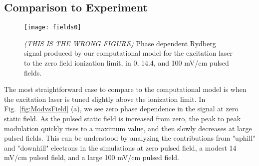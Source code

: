 \documentclass[aps,pra,preprint,groupedaddress]{revtex4-1}
\begin{document}

\subsection{Comparison to Experiment}
\label{sec:ComptoExp}









\begin{figure}
	\texttt{[image: fields0]}
	\caption{\emph{(THIS IS THE WRONG FIGURE)} Phase dependent Rydberg signal produced by our computational model for the excitation laser to the zero field ionization limit, in 0, 14.4, and 100 mV/cm pulsed fields.}
	\label{fig:SimModAbove}
\end{figure}

The most straightforward case to compare to the computational model is when the excitation laser is tuned slightly above the ionization limit. In Fig.~\ref{fig:ModvsField} (a), we see zero phase dependence in the signal at zero static field. As the pulsed static field is increased from zero, the peak to peak modulation quickly rises to a maximum value, and then slowly decreases at large pulsed fields. This can be understood by analyzing the contributions from "uphill" and "downhill" electrons in the simulations at zero pulsed field, a modest 14 mV/cm pulsed field, and a large 100 mV/cm pulsed field.
\end{document}
